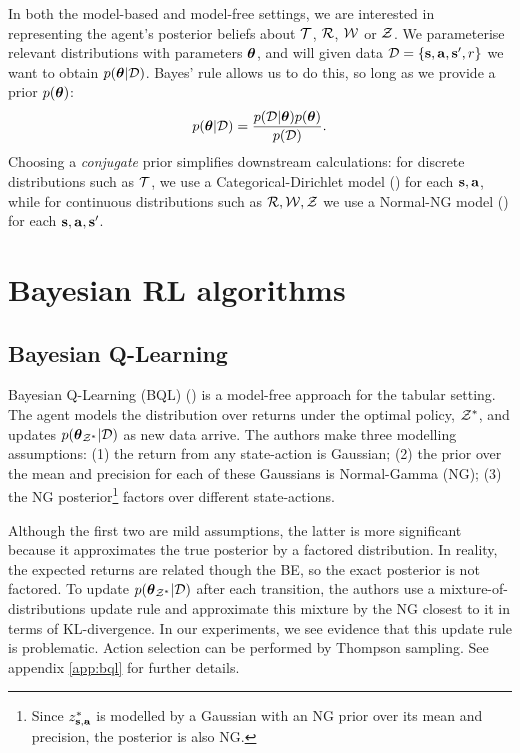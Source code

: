 \documentclass{article}
\begin{document}
In both the model-based and model-free settings, we are interested in representing the agent's posterior beliefs about $\mathcal{T}$, $\mathcal{R}$, $\mathcal{W}$ or $\mathcal{Z}$. We parameterise relevant distributions with parameters $\boldsymbol{\theta}$, and will given data $\mathcal{D} = \{\mathbf{s}, \mathbf{a}, \mathbf{s}', r\}$ we want to obtain $p(\boldsymbol{\theta} | \mathcal{D})$. Bayes' rule allows us to do this, so long as we provide a prior $p(\boldsymbol{\theta})$:
\begin{align}
p(\boldsymbol{\theta} | \mathcal{D}) = \frac{p(\mathcal{D} | \boldsymbol{\theta}) p(\boldsymbol{\theta})}{p(\mathcal{D})}.
\end{align}
Choosing a \textit{conjugate} prior simplifies downstream calculations: for discrete distributions such as $\mathcal{T}$, we use a Categorical-Dirichlet model (\cite{bishop}) for each $\mathbf{s}, \mathbf{a}$, while for continuous distributions such as $\mathcal{R}, \mathcal{W}, \mathcal{Z}$ we use a Normal-NG model (\cite{murphy}) for each $\mathbf{s}, \mathbf{a}, \mathbf{s}'$.


\section{Bayesian RL algorithms}
\subsection{Bayesian Q-Learning}
Bayesian Q-Learning (BQL) (\cite{bqlearning}) is a model-free approach for the tabular setting. The agent models the distribution over returns under the optimal policy, $\mathcal{Z}^*$, and updates $p(\boldsymbol{\theta}_{\mathcal{Z}^*} | \mathcal{D})$ as new data arrive. The authors make three modelling assumptions: (1) the return from any state-action is Gaussian; (2) the prior over the mean and precision for each of these Gaussians is Normal-Gamma (NG); (3) the NG posterior\footnote{Since $z^*_{\mathbf{s}, \mathbf{a}}$ is modelled by a Gaussian with an NG prior over its mean and precision, the posterior is also NG.} factors over different state-actions.

Although the first two are mild assumptions, the latter is more significant because it approximates the true posterior by a factored distribution. In reality, the expected returns are related though the BE, so the exact posterior is not factored. To update $p(\boldsymbol{\theta}_{\mathcal{Z}^*} | \mathcal{D})$ after each transition, the authors use a mixture-of-distributions update rule and approximate this mixture by the NG closest to it in terms of KL-divergence. In our experiments, we see evidence that this update rule is problematic. Action selection can be performed by Thompson sampling. See appendix \ref{app:bql} for further details.
\end{document}
